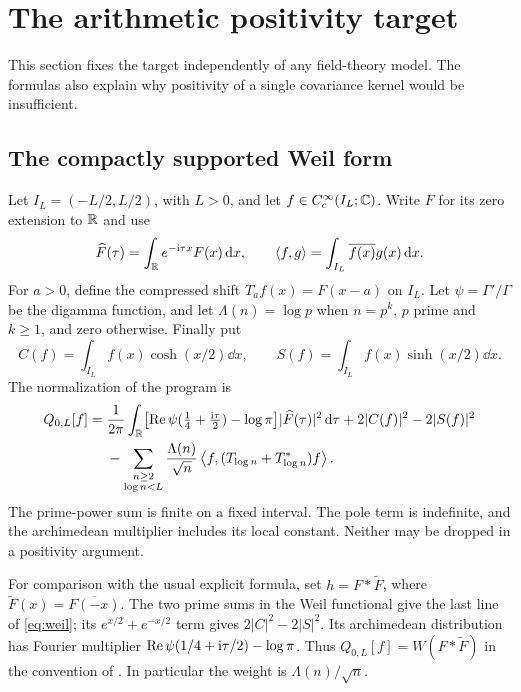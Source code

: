 \section{The arithmetic positivity target}\label{sec:arithmetic}

This section fixes the target independently of any field-theory model.
The formulas also explain why positivity of a single covariance kernel
would be insufficient.

\subsection{The compactly supported Weil form}

Let $I_L=(-L/2,L/2)$, with $L>0$, and let
$f\in C_c^\infty(I_L;\mathbb C)$. Write $F$ for its zero extension to $\mathbb R$ and use
\begin{equation}
 \widehat F(\tau)=\int_\mathbb R e^{-\mathrm i\tau x}F(x)\,\mathrm d x,
 \qquad \left\langle f,g\right\rangle=\int_{I_L}\overline{f(x)}g(x)\,\mathrm d x.
\end{equation}
For $a>0$, define the compressed shift $T_af(x)=F(x-a)$ on $I_L$.
Let $\psi=\Gamma'/\Gamma$ be the digamma function, and let
$\Lambda(n)=\log p$ when $n=p^k$, $p$ prime and $k\geq1$, and zero otherwise.
Finally put
\begin{equation}
 C(f)=\int_{I_L}f(x)\cosh(x/2)\dd x,
 \qquad S(f)=\int_{I_L}f(x)\sinh(x/2)\dd x.
\end{equation}
The normalization of the program is
\begin{align}\label{eq:weil}
 Q_{0,L}[f]={}&\frac1{2\pi}\int_\mathbb R
 \bigl[\operatorname{Re}\psi(\tfrac14+\tfrac{\mathrm i\tau}2)-\log\pi\bigr]
 |\widehat F(\tau)|^2\,\mathrm d\tau
 +2|C(f)|^2-2|S(f)|^2\notag\\
 &-\sum_{\substack{n\geq2\\\log n<L}}
 \frac{\Lambda(n)}{\sqrt n}\left\langle f,(T_{\log n}+T_{\log n}^*)f\right\rangle.
\end{align}
The prime-power sum is finite on a fixed interval. The pole term is
indefinite, and the archimedean multiplier includes its local constant.
Neither may be dropped in a positivity argument.

For comparison with the usual explicit formula, set
$h=F*\widetilde F$, where $\widetilde F(x)=\overline{F(-x)}$.
The two prime sums in the Weil functional give the last line of
\eqref{eq:weil}; its $e^{x/2}+e^{-x/2}$ term gives
$2|C|^2-2|S|^2$. Its archimedean distribution has Fourier multiplier
$\operatorname{Re}\psi(1/4+\mathrm i\tau/2)-\log\pi$. Thus
$Q_{0,L}[f]=W(F*\widetilde F)$ in the convention of
\cite[p.~1]{Suzuki}. In particular the weight is $\Lambda(n)/\sqrt n$.

